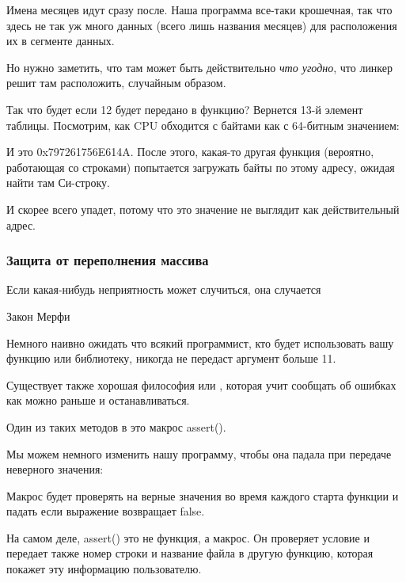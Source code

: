 Имена месяцев идут сразу после.
Наша программа все-таки крошечная,
так что здесь не так уж много данных (всего лишь названия месяцев) для расположения их в сегменте данных.

Но нужно заметить, что там может быть действительно \emph{что угодно}, что линкер решит там расположить, случайным образом.%

Так что будет если 12 будет передано в функцию?
Вернется 13-й элемент таблицы.
Посмотрим, как CPU обходится с байтами как с 64-битным значением:



И это 0x797261756E614A.
После этого, какая-то другая функция (вероятно, работающая со строками) попытается загружать байты
по этому адресу, ожидая найти там Си-строку.

И скорее всего упадет, потому что это значение не выглядит как действительный адрес.

\subsubsection{Защита от переполнения массива}

\epigraph{Если какая-нибудь неприятность может случиться, она случается}{Закон Мерфи}

Немного наивно ожидать что всякий программист, кто будет использовать вашу функцию или библиотеку,
никогда не передаст аргумент больше 11.

Существует также хорошая философия  или ,
которая учит сообщать об ошибках как можно раньше и останавливаться.

Один из таких методов в \CCpp это макрос assert().

Мы можем немного изменить нашу программу, чтобы она падала при передаче неверного значения:



Макрос будет проверять на верные значения во время каждого старта функции и падать если выражение возвращает false.



На самом деле, assert() это не функция, а макрос. Он проверяет условие и передает также номер строки и название
файла в другую функцию, которая покажет эту информацию пользователю.

